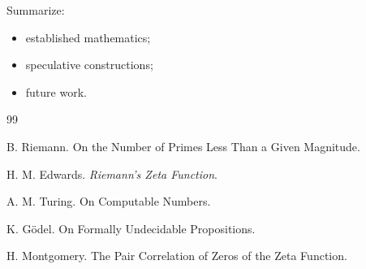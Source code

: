 \documentclass[11pt]{article}
\theoremstyle{definition}
\theoremstyle{remark}
\begin{document}
Summarize:

\begin{itemize}
\item established mathematics;
\item speculative constructions;
\item future work.
\end{itemize}



\begin{thebibliography}{99}

B. Riemann.
On the Number of Primes Less Than a Given Magnitude.

H. M. Edwards.
\textit{Riemann's Zeta Function}.

A. M. Turing.
On Computable Numbers.

K. Gödel.
On Formally Undecidable Propositions.

H. Montgomery.
The Pair Correlation of Zeros of the Zeta Function.

\end{thebibliography}
\end{document}
